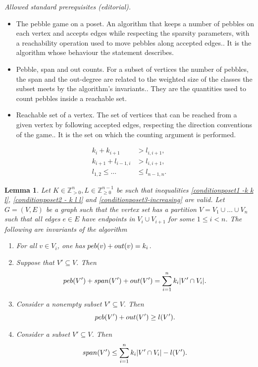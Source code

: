 \documentclass[10pt,a4paper]{article}
\newtheorem{lemma}[theorem]{Lemma}
\newtheorem{rem
ark}[theorem]{Remark}
\newcommand{\out}{\textup{out}}
\newcommand{\spa}{\textup{span}}
\newcommand{\peb}{\textup{peb}}
\begin{document}
\noindent\textit{Allowed standard prerequisites (editorial).}\begin{itemize}
\item The pebble game on a poset. An algorithm that keeps a number of pebbles on each vertex and accepts edges while respecting the sparsity parameters, with a reachability operation used to move pebbles along accepted edges.. It is the algorithm whose behaviour the statement describes.
\item Pebble, span and out counts. For a subset of vertices the number of pebbles, the span and the out-degree are related to the weighted size of the classes the subset meets by the algorithm's invariants.. They are the quantities used to count pebbles inside a reachable set.
\item Reachable set of a vertex. The set of vertices that can be reached from a given vertex by following accepted edges, respecting the direction conventions of the game.. It is the set on which the counting argument is performed.
\end{itemize}\medskip
\begin{align}
    k_i + k_{i+1} &> l_{i, i+1} \label{conditionposet1 -k k l},\\
    k_{i+1} + l_{i-1, i} &> l_{i, i+1}\label{conditionposet2 - k l l},\\
     l_{1,2} \leq  \dots &\leq l_{n-1,n}. \label{conditionposet3-increasing}
\end{align}

\begin{lemma}\label{invariants - posets}
 Let $K\in \mathbb{Z}_{>0}^{n}, L\in \mathbb{Z}_{\geq 0}^{n-1}$ be such that inequalities \eqref{conditionposet1 -k k l}, \eqref{conditionposet2 - k l l} and \eqref{conditionposet3-increasing} are valid. Let $G=(V,E)$ be a graph such that the vertex set has a partition $V=V_1\cup \dots \cup V_n$ such that all edges $e\in E$ have endpoints in $V_{i} \cup V_{i+1}$ for some $1 \leq i < n$. The following are invariants of the algorithm
    \begin{enumerate}
        \item For all $v\in V_i$, one has $\peb(v)+ \out(v) = k_{i}$.
        \item Suppose that $V'\subseteq V$. Then $$\peb(V')+ \spa(V')+ \out(V') = \sum_{i=1}^{n} k_i \vert  V' \cap V_i  \vert.$$
        \item Consider a nonempty subset $V' \subseteq V$. Then $$\peb(V') + \out(V') \geq l(V').$$ 
    \item Consider a subset $V' \subseteq V$. Then $$\spa(V') \leq \sum_{i=1}^{n} k_i \vert  V' \cap V_i \vert - l(V').$$
    \end{enumerate}
\end{lemma}
\end{document}

